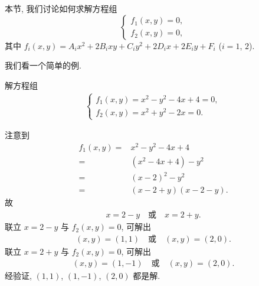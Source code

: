 本节, 我们讨论如何求解方程组
\begin{equation}
    \begin{cases}
        f_1 (x, y) = 0, \\
        f_2 (x, y) = 0,
    \end{cases}
    \label{eq:A0301}
\end{equation}
其中 \(f_i (x, y) = A_i x^2 + 2B_i xy + C_i y^2
+ 2D_i x + 2E_i y + F_i\)
(\(i = 1\), \(2\)).

我们看一个简单的例.

\begin{example}
    解方程组
    \begin{align*}
        \begin{cases}
            f_1 (x, y) = x^2 - y^2 - 4x + 4 = 0, \\
            f_2 (x, y) = x^2 + y^2 - 2x = 0.
        \end{cases}
    \end{align*}

    注意到
    \begin{align*}
        f_1 (x, y)
        = {} & x^2 - y^2 - 4x + 4      \\
        = {} & (x^2 - 4x + 4) - y^2    \\
        = {} & (x - 2)^2 - y^2         \\
        = {} & (x - 2 + y)(x - 2 - y).
    \end{align*}
    故
    \begin{align*}
        x = 2 - y
        \quad \text{或} \quad
        x = 2 + y.
    \end{align*}
    联立 \(x = 2 - y\) 与 \(f_2 (x, y) = 0\),
    可解出
    \begin{align*}
        (x, y) = (1, 1)
        \quad \text{或} \quad
        (x, y) = (2, 0).
    \end{align*}
    联立 \(x = 2 + y\) 与 \(f_2 (x, y) = 0\),
    可解出
    \begin{align*}
        (x, y) = (1, -1)
        \quad \text{或} \quad
        (x, y) = (2, 0).
    \end{align*}
    经验证, \((1, 1)\), \((1, -1)\), \((2, 0)\) 都是解.


\end{example}

